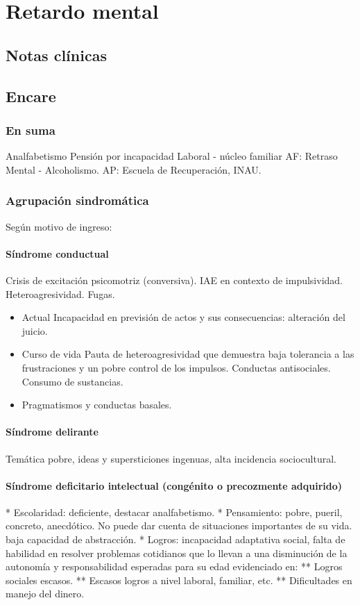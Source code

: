 \chapter{Retardo mental}
\section*{Notas clínicas}
\section*{Encare}
\subsection*{En suma}
Analfabetismo Pensión por incapacidad Laboral - núcleo familiar AF: Retraso Mental - Alcoholismo. AP: Escuela de Recuperación, INAU.
\subsection*{Agrupación sindromática}
Según motivo de ingreso:
\subsubsection*{Síndrome conductual}
Crisis de excitación psicomotriz (conversiva). IAE en contexto de impulsividad. Heteroagresividad. Fugas.
\begin{itemize}
	\item Actual Incapacidad en previsión de actos y sus consecuencias: alteración del juicio.
	\item Curso de vida Pauta de heteroagresividad que demuestra baja tolerancia a las frustraciones y un pobre control de los impulsos. Conductas antisociales. Consumo de sustancias.
	\item Pragmatismos y conductas basales.
\end{itemize}
\subsubsection*{Síndrome delirante}
Temática pobre, ideas y supersticiones ingenuas, alta incidencia sociocultural.
\subsubsection{Síndrome deficitario intelectual (congénito o precozmente adquirido)}

* Escolaridad: deficiente, destacar analfabetismo.
* Pensamiento: pobre, pueril, concreto, anecdótico. No puede dar cuenta de situaciones importantes de su vida. baja capacidad de abstracción.
* Logros: incapacidad adaptativa social, falta de habilidad en resolver problemas cotidianos que lo llevan a una disminución de la autonomía y responsabilidad esperadas para su edad evidenciado en:
** Logros sociales escasos.
** Escasos logros a nivel laboral, familiar, etc.
** Dificultades en manejo del dinero.

